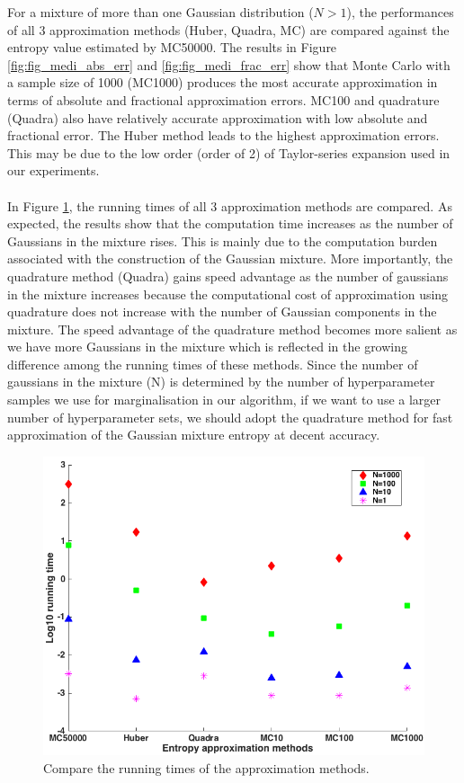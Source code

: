 \documentclass[a4paper,11pt]{report}
\begin{document}
\noindent
For a mixture of more than one Gaussian distribution ($N>1$),  the performances of all 3 approximation methods (Huber, Quadra, MC) are compared against the entropy value estimated by MC50000. The results in Figure  \ref{fig:fig_medi_abs_err} and \ref{fig:fig_medi_frac_err} show that Monte Carlo with a sample size of 1000 (MC1000) produces the most accurate approximation in terms of absolute and fractional approximation errors.  MC100 and quadrature (Quadra) also have relatively accurate approximation with low absolute and fractional error. The Huber method leads to the highest approximation errors. This may be due to the low order (order of 2) of Taylor-series expansion used in our experiments.  
\\\\
In Figure \ref{runningtime}, the running times of all 3 approximation methods are compared. As expected, the results show that the computation time increases as the number of Gaussians in the mixture rises. This is mainly due to the computation burden associated with the construction of the Gaussian mixture. More importantly, the quadrature method (Quadra) gains speed advantage as the number of gaussians in the mixture increases because the computational cost of approximation using quadrature does not increase with the number of Gaussian components in the mixture. The speed advantage of the quadrature method becomes more salient as we have more Gaussians in the mixture which is reflected in the growing difference among the running times of these methods. Since the number of gaussians in the mixture (N) is determined by the number of hyperparameter samples we use for  marginalisation in our algorithm, if we want to use a larger number of hyperparameter sets, we should adopt the quadrature method for fast approximation of the Gaussian mixture entropy at decent accuracy. 
\\
\begin{figure} [H]
\label{runningtime} 
\captionsetup{justification=centering}
	\centering
	 \includegraphics[width=0.7\linewidth]{Running_time.png}
\caption{ Compare the running times of the approximation methods. }
\end{figure}
\end{document}
